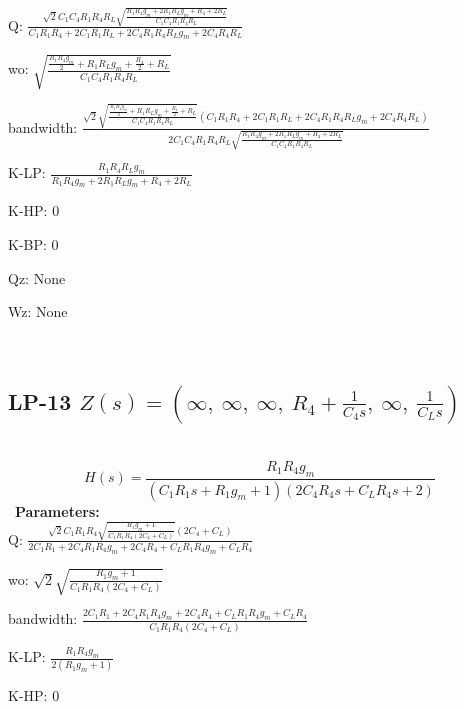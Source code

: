 \documentclass{article}
\begin{document}
Q: $\frac{\sqrt{2} C_{1} C_{4} R_{1} R_{4} R_{L} \sqrt{\frac{R_{1} R_{4} g_{m} + 2 R_{1} R_{L} g_{m} + R_{4} + 2 R_{L}}{C_{1} C_{4} R_{1} R_{4} R_{L}}}}{C_{1} R_{1} R_{4} + 2 C_{1} R_{1} R_{L} + 2 C_{4} R_{1} R_{4} R_{L} g_{m} + 2 C_{4} R_{4} R_{L}}$\ 

wo: $\sqrt{\frac{\frac{R_{1} R_{4} g_{m}}{2} + R_{1} R_{L} g_{m} + \frac{R_{4}}{2} + R_{L}}{C_{1} C_{4} R_{1} R_{4} R_{L}}}$\ 

bandwidth: $\frac{\sqrt{2} \sqrt{\frac{\frac{R_{1} R_{4} g_{m}}{2} + R_{1} R_{L} g_{m} + \frac{R_{4}}{2} + R_{L}}{C_{1} C_{4} R_{1} R_{4} R_{L}}} \left(C_{1} R_{1} R_{4} + 2 C_{1} R_{1} R_{L} + 2 C_{4} R_{1} R_{4} R_{L} g_{m} + 2 C_{4} R_{4} R_{L}\right)}{2 C_{1} C_{4} R_{1} R_{4} R_{L} \sqrt{\frac{R_{1} R_{4} g_{m} + 2 R_{1} R_{L} g_{m} + R_{4} + 2 R_{L}}{C_{1} C_{4} R_{1} R_{4} R_{L}}}}$\ 

K-LP: $\frac{R_{1} R_{4} R_{L} g_{m}}{R_{1} R_{4} g_{m} + 2 R_{1} R_{L} g_{m} + R_{4} + 2 R_{L}}$\ 

K-HP: $0$\ 

K-BP: $0$\ 

Qz: $\text{None}$\ 

Wz: $\text{None}$\ 

\ 

\subsection{LP-13 $Z(s) = \left( \infty, \  \infty, \  \infty, \  R_{4} + \frac{1}{C_{4} s}, \  \infty, \  \frac{1}{C_{L} s}\right)$ } \ 
\textbf{\[H(s) = \frac{R_{1} R_{4} g_{m}}{\left(C_{1} R_{1} s + R_{1} g_{m} + 1\right) \left(2 C_{4} R_{4} s + C_{L} R_{4} s + 2\right)}\] } \ 
\textbf{Parameters:}\\ 

Q: $\frac{\sqrt{2} C_{1} R_{1} R_{4} \sqrt{\frac{R_{1} g_{m} + 1}{C_{1} R_{1} R_{4} \left(2 C_{4} + C_{L}\right)}} \left(2 C_{4} + C_{L}\right)}{2 C_{1} R_{1} + 2 C_{4} R_{1} R_{4} g_{m} + 2 C_{4} R_{4} + C_{L} R_{1} R_{4} g_{m} + C_{L} R_{4}}$\ 

wo: $\sqrt{2} \sqrt{\frac{R_{1} g_{m} + 1}{C_{1} R_{1} R_{4} \left(2 C_{4} + C_{L}\right)}}$\ 

bandwidth: $\frac{2 C_{1} R_{1} + 2 C_{4} R_{1} R_{4} g_{m} + 2 C_{4} R_{4} + C_{L} R_{1} R_{4} g_{m} + C_{L} R_{4}}{C_{1} R_{1} R_{4} \left(2 C_{4} + C_{L}\right)}$\ 

K-LP: $\frac{R_{1} R_{4} g_{m}}{2 \left(R_{1} g_{m} + 1\right)}$\ 

K-HP: $0$\ 
\end{document}
